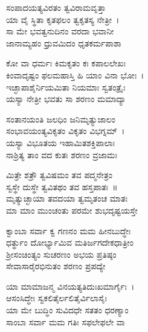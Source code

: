 
\begin{myquote}
ಸಂಪಾದಯತ್ಯವಿರತಂ ತ್ವವಿರಾಮವೃತ್ತಾ\\ಯಾ ವೈ ಸ್ಥಿತಾ ಕೃತಫಲಂ ತ್ವಕೃತಸ್ಯ ನೇತ್ರೀ~।\\
ಸಾ ಮೇ ಭವತ್ವನುದಿನಂ ವರದಾ ಭವಾನೀ\\ಜಾನಾಮ್ಯಹಂ ಧ್ರುವಮಿದಂ ಧೃತಕರ್ಮಪಾಶಾ
\end{myquote}


\begin{myquote}
ಕೋ ವಾ ಧರ್ಮಃ ಕಿಮಕೃತಂ ಕಃ ಕಪಾಲಲೇಖಃ\\ಕಿಂವಾದೃಷ್ಟಂ ಫಲಮಹಾಸ್ತಿ ಹಿ ಯಾಂ ವಿನಾ ಭೋಃ~।\\
ಇಚ್ಛಾಪಾಶೈರ್ನಿಯಮಿತಾ ನಿಯಮಾಃ ಸ್ವತಂತ್ರೈಃ\\ಯಸ್ಯಾ ನೇತ್ರೀ ಭವತು ಸಾ ಶರಣಂ ಮಮಾದ್ಯಾ
\end{myquote}


\begin{myquote}
ಸಂತಾನಯಂತಿ ಜಲಧಿಂ ಜನಿಮೃತ್ಯುಜಾಲಂ\\ಸಂಭಾವಯಂತ್ಯವಿಕೃತಂ ವಿಕೃತಂ ವಿಭಗ್ನಮ್~।\\
ಯಸ್ಯಾ ವಿಭೂತಯ ಇಹಾಮಿತಶಕ್ತಿಪಾಲಾಃ\\ನಾಶ್ರಿತ್ಯ ತಾಂ ವದ ಕುತಃ ಶರಣಂ ವ್ರಜಾಮಃ
\end{myquote}


\begin{myquote}
ಮಿತ್ರೇ ಶತ್ರೌ ತ್ವವಿಷಮಂ ತವ ಪದ್ಮನೇತ್ರಂ\\ಸ್ವಸ್ಥೇ ದುಸ್ಥೇ ತ್ವವಿತಥಂ ತವ ಹಸ್ತಪಾತಃ~॥\\ಮೃತ್ಯುಚ್ಛಾಯಾ ತವದಯಾ ತ್ವಮೃತಂಚ ಮಾತಃ\\ಮಾ ಮಾಂ ಮುಂಚಂತು ಪರಮೇ ಶುಭದೃಷ್ಟಯಸ್ತೇ
\end{myquote}


\begin{myquote}
ಕ್ವಾಂಬಾ ಸರ್ವಾ ಕ್ವ ಗಣನಂ ಮಮ ಹೀನಬುದ್ಧೇಃ\\ಧರ್ತ್ಥುಂ ದೋರ್ಭ್ಯಾಮಿವ ಮತಿರ್ಜಗದೇಕಧಾತ್ರೀಂ\\ಶ‍್ರೀಸಂಚಿಂತ್ಯಂ ಸುಚರಣಂ ಅಭಯ ಪ್ರತಿಷ್ಠಂ\\ಸೇವಾಸಾರೈರಭಿನುತಂ ಶರಣಂ ಪ್ರಪದ್ಯೇ
\end{myquote}


\begin{myquote}
ಯಾ ಮಾಮಾಜನ್ಮ ವಿನಯತ್ಯತಿದುಃಖಮಾರ್ಗೈಃ~।\\
ಆಸಂಸಿದ್ಧೇಃ ಸ್ವಕಲಿತೈರ್ಲಲಿತೈರ್ವಿಲಾಸೈಃ\\ಯಾ ಮೇ ಬುದ್ಧಿಂ ಸುವಿದಧೇ ಸತತಂ ಧರಣ್ಯಾಂ\\ಸಾಂಬಾ ಸರ್ವಾ ಮಮ ಗತಿಃ ಸಫಲೇಫಲೇ ವಾ
\end{myquote}

